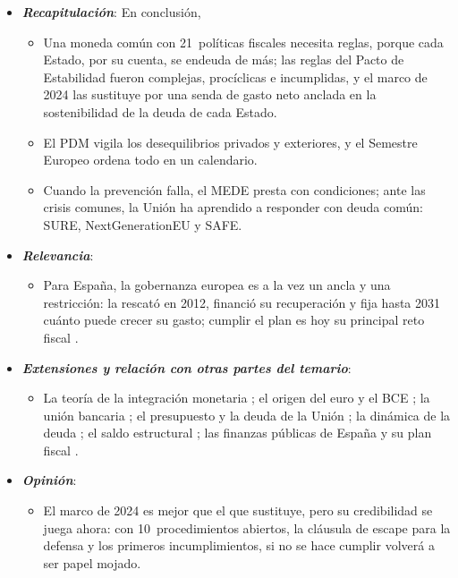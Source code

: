 \documentclass[11pt]{article}
\begin{document}
\begin{itemize}
\item \textbf{\emph{Recapitulación}}: En conclusión,
  \begin{itemize}
  \item Una moneda común con 21~políticas fiscales necesita reglas, porque cada Estado, por su cuenta, se endeuda de más; las reglas del Pacto de Estabilidad fueron complejas, procíclicas e incumplidas, y el marco de 2024 las sustituye por una senda de gasto neto anclada en la sostenibilidad de la deuda de cada Estado.
  \item El PDM vigila los desequilibrios privados y exteriores, y el Semestre Europeo ordena todo en un calendario.
  \item Cuando la prevención falla, el MEDE presta con condiciones; ante las crisis comunes, la Unión ha aprendido a responder con deuda común: SURE, NextGenerationEU y SAFE.
  \end{itemize}
\item \textbf{\emph{Relevancia}}:
  \begin{itemize}
  \item Para España, la gobernanza europea es a la vez un ancla y una restricción: la rescató en 2012, financió su recuperación y fija hasta 2031 cuánto puede crecer su gasto; cumplir el plan es hoy su principal reto fiscal .
  \end{itemize}
\item \textbf{\emph{Extensiones y relación con otras partes del temario}}:
  \begin{itemize}
  \item La teoría de la integración monetaria ; el origen del euro y el BCE ; la unión bancaria ; el presupuesto y la deuda de la Unión ; la dinámica de la deuda ; el saldo estructural ; las finanzas públicas de España y su plan fiscal .
  \end{itemize}
\item \textbf{\emph{Opinión}}:
  \begin{itemize}
  \item El marco de 2024 es mejor que el que sustituye, pero su credibilidad se juega ahora: con 10~procedimientos abiertos, la cláusula de escape para la defensa y los primeros incumplimientos, si no se hace cumplir volverá a ser papel mojado.


\end{itemize}
\end{itemize}
\end{document}
